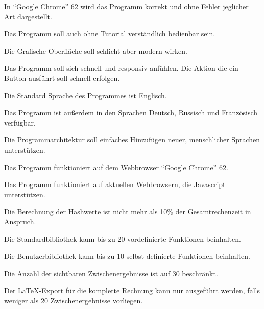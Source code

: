 \documentclass[parskip=full,11pt,twoside]{scrartcl}
\begin{document}
In \enquote{Google Chrome} 62 wird das Programm korrekt und ohne Fehler jeglicher Art dargestellt.

Das Programm soll auch ohne Tutorial verständlich bedienbar sein.

Die Grafische Oberfläche soll schlicht aber modern wirken.

Das Programm soll sich schnell und responsiv anfühlen. Die Aktion die ein Button ausführt soll schnell erfolgen.

Die Standard Sprache des Programmes ist Englisch.

Das Programm ist außerdem in den Sprachen Deutsch, Russisch und Französisch verfügbar.

Die Programmarchitektur soll einfaches Hinzufügen neuer, menschlicher Sprachen unterstützen.

Das Programm funktioniert auf dem Webbrowser \enquote{Google Chrome} 62.

Das Programm funktioniert auf aktuellen Webbrowsern, die Javascript unterstützen.

Die Berechnung der Hashwerte ist nicht mehr als 10\% der Gesamtrechenzeit in Anspruch.

Die Standardbibliothek kann bis zu 20 vordefinierte Funktionen beinhalten.

Die Benutzerbibliothek kann bis zu 10 selbst definierte Funktionen beinhalten.

Die Anzahl der sichtbaren Zwischenergebnisse ist auf 30 beschränkt.

Der LaTeX-Export für die komplette Rechnung kann nur ausgeführt werden, falls weniger als 20 Zwischenergebnisse vorliegen.
\end{document}

